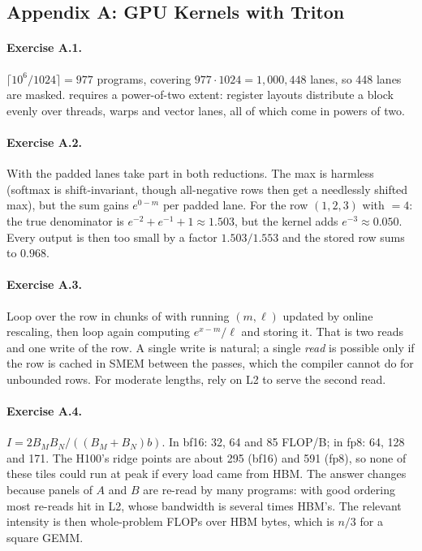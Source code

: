 \subsection*{Appendix A: GPU Kernels with Triton}

\paragraph{Exercise A.1.} $\lceil10^6/1024\rceil=977$ programs, covering
$977\cdot1024=1{,}000{,}448$ lanes, so 448 lanes are masked.  requires a
power-of-two extent: register layouts distribute a block evenly over threads, warps and
vector lanes, all of which come in powers of two.

\paragraph{Exercise A.2.} With  the padded lanes take part in both
reductions. The max is harmless (softmax is shift-invariant, though all-negative rows
then get a needlessly shifted max), but the sum gains $e^{0-m}$ per padded lane. For the
row $(1,2,3)$ with $=4$: the true denominator is $e^{-2}+e^{-1}+1\approx1.503$,
but the kernel adds $e^{-3}\approx0.050$. Every output is then too small by a factor
$1.503/1.553$ and the stored row sums to $0.968$.

\paragraph{Exercise A.3.} Loop over the row in chunks of  with running
$(m,\ell)$ updated by online rescaling, then loop again computing
$e^{x-m}/\ell$ and storing it. That is two reads and one write of the row. A single
write is natural; a single \emph{read} is possible only if the row is cached in SMEM
between the passes, which the compiler cannot do for unbounded rows. For moderate
lengths, rely on L2 to serve the second read.

\paragraph{Exercise A.4.} $I=2B_MB_N/((B_M+B_N)b)$. In bf16: 32, 64 and 85 FLOP/B; in
fp8: 64, 128 and 171. The H100's ridge points are about 295 (bf16) and 591 (fp8), so none
of these tiles could run at peak if every load came from HBM. The answer changes because
panels of $A$ and $B$ are re-read by many programs: with good ordering most re-reads hit
in L2, whose bandwidth is several times HBM's. The relevant intensity is then
whole-problem FLOPs over HBM bytes, which is $n/3$ for a square GEMM.

